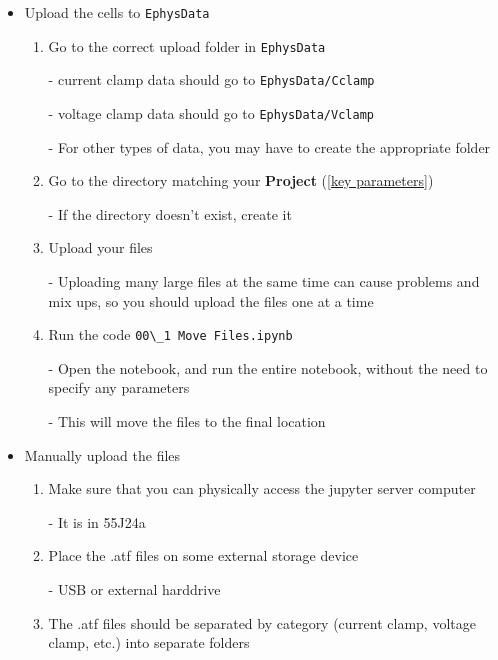 \documentclass{article}
\begin{document}
\begin{itemize}
    \item Upload the cells to \verb|EphysData|
    \begin{enumerate}
        \item Go to the correct upload folder in \verb|EphysData|
        
         - current clamp data should go to \verb|EphysData/Cclamp|
         
        - voltage clamp data should go to \verb|EphysData/Vclamp|
        
        - For other types of data, you may have to create the appropriate folder
        
        \item Go to the directory matching your \textbf{Project} (\ref{key parameters})
        
        - If the directory doesn't exist, create it
        
        \item Upload your files
        
        - Uploading many large files at the same time can cause problems and mix ups, so you should upload the files one at a time
        
        \item Run the code \verb|00\_1 Move Files.ipynb|
        
        - Open the notebook, and run the entire notebook, without the need to specify any parameters
        
        - This will move the files to the final location
    \end{enumerate}
    
    \item Manually upload the files
    
    \begin{enumerate}
        \item Make sure that you can physically access the jupyter server computer
        
        - It is in 55J24a
        
        \item Place the .atf files on some external storage device
        
        - USB or external harddrive
        
        \item The .atf files should be separated by category (current clamp, voltage clamp, etc.) into separate folders
        

\end{enumerate}
\end{itemize}
\end{document}
